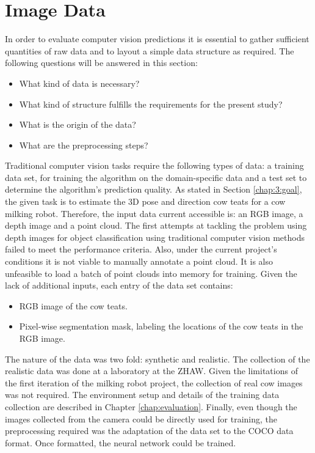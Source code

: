 \section{Image Data}\label{chap:3:data}
In order to evaluate computer vision predictions it is essential to gather sufficient quantities of raw data and to layout a simple data structure as required. The following questions will be answered in this section:
\begin{itemize}
    \item What kind of data is necessary?
    \item What kind of structure fulfills the requirements for the present study?
    \item What is the origin of the data?
    \item What are the preprocessing steps?
\end{itemize}
Traditional computer vision tasks require the following types of data: a training data set, for training the algorithm on the domain-specific data and a test set to determine the algorithm's prediction quality. As stated in Section \ref{chap:3:goal}, the given task is to estimate the 3D pose and direction cow teats for a cow milking robot. Therefore, the input data current accessible is: an RGB image, a depth image and a point cloud. The first attempts at tackling the problem using depth images for object classification using traditional computer vision methods failed to meet the performance criteria. Also, under the current project's conditions it is not viable to manually annotate a point cloud. It is also unfeasible to load a batch of point clouds into memory for training. Given the lack of additional inputs, each entry of the data set contains:
\begin{itemize}
    \item RGB image of the cow teats.
    \item Pixel-wise segmentation mask, labeling the locations of the cow teats in the RGB image.
\end{itemize}
The nature of the data was two fold: synthetic and realistic. The collection of the realistic data was done at a laboratory at the ZHAW. Given the limitations of the first iteration of the milking robot project, the collection of real cow images was not required. The environment setup and details of the training data collection are described in Chapter \ref{chap:evaluation}. Finally, even though the images collected from the camera could be directly used for training, the preprocessing required was the adaptation of the data set to the COCO data format. Once formatted, the neural network could be trained.

